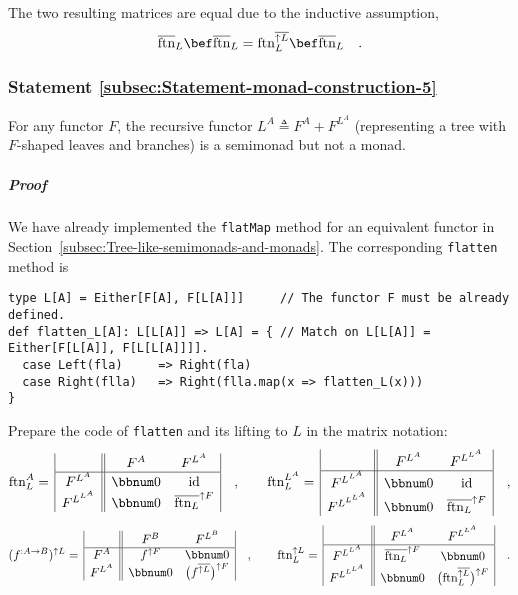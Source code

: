 The two resulting matrices are equal due to the inductive assumption,
\[
\overline{\text{ftn}}_{L}\bef\overline{\text{ftn}}_{L}=\text{ftn}_{L}^{\overline{\uparrow L}}\bef\overline{\text{ftn}}_{L}\quad.
\]


\subsubsection{Statement \label{subsec:Statement-monad-construction-5}\ref{subsec:Statement-monad-construction-5}}

For any functor $F$, the recursive functor $L^{A}\triangleq F^{A}+F^{L^{A}}$
(representing a tree with $F$-shaped leaves and branches) is a semimonad
but not a monad.

\subparagraph{Proof}

We have already implemented the \lstinline!flatMap! method for an
equivalent functor in Section~\ref{subsec:Tree-like-semimonads-and-monads}.
The corresponding \lstinline!flatten! method is
\begin{lstlisting}
type L[A] = Either[F[A], F[L[A]]]     // The functor F must be already defined.
def flatten_L[A]: L[L[A]] => L[A] = { // Match on L[L[A]] = Either[F[L[A]], F[L[L[A]]]].
  case Left(fla)     => Right(fla)
  case Right(flla)   => Right(flla.map(x => flatten_L(x)))
}
\end{lstlisting}
Prepare the code of \lstinline!flatten! and its lifting to $L$ in
the matrix notation:
\[
\text{ftn}_{L}^{A}=\,\begin{array}{|c||cc|}
 & F^{A} & F^{L^{A}}\\
\hline F^{L^{A}} & \bbnum 0 & \text{id}\\
F^{L^{L^{A}}} & \bbnum 0 & \overline{\text{ftn}_{L}}^{\uparrow F}
\end{array}\quad,\quad\quad\text{ftn}_{L}^{L^{A}}=\,\begin{array}{|c||cc|}
 & F^{L^{A}} & F^{L^{L^{A}}}\\
\hline F^{L^{L^{A}}} & \bbnum 0 & \text{id}\\
F^{L^{L^{L^{A}}}} & \bbnum 0 & \overline{\text{ftn}_{L}}^{\uparrow F}
\end{array}\quad,
\]
\[
(f^{:A\rightarrow B})^{\uparrow L}=\,\begin{array}{|c||cc|}
 & F^{B} & F^{L^{B}}\\
\hline F^{A} & f^{\uparrow F} & \bbnum 0\\
F^{L^{A}} & \bbnum 0 & \big(f^{\overline{\uparrow L}}\big)^{\uparrow F}
\end{array}\quad,\quad\quad\text{ftn}_{L}^{\uparrow L}=\,\begin{array}{|c||cc|}
 & F^{L^{A}} & F^{L^{L^{A}}}\\
\hline F^{L^{L^{A}}} & \overline{\text{ftn}_{L}}^{\uparrow F} & \bbnum 0\\
F^{L^{L^{L^{A}}}} & \bbnum 0 & \big(\text{ftn}_{L}^{\overline{\uparrow L}}\big)^{\uparrow F}
\end{array}\quad.
\]
